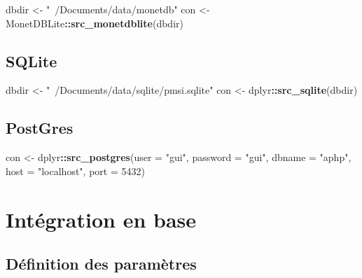 \documentclass[]{book}
\newenvironment{Shaded}{\begin{snugshade}}{\end{snugshade}}
\newcommand{\KeywordTok}[1]{\textcolor[rgb]{0.13,0.29,0.53}{\textbf{#1}}}
\newcommand{\DataTypeTok}[1]{\textcolor[rgb]{0.13,0.29,0.53}{#1}}
\newcommand{\DecValTok}[1]{\textcolor[rgb]{0.00,0.00,0.81}{#1}}
\newcommand{\StringTok}[1]{\textcolor[rgb]{0.31,0.60,0.02}{#1}}
\newcommand{\OperatorTok}[1]{\textcolor[rgb]{0.81,0.36,0.00}{\textbf{#1}}}
\newcommand{\NormalTok}[1]{#1}
\begin{document}
\begin{Shaded}
\begin{Highlighting}[]
\NormalTok{dbdir <-}\StringTok{ "~/Documents/data/monetdb"}
\NormalTok{con <-}\StringTok{ }\NormalTok{MonetDBLite}\OperatorTok{::}\KeywordTok{src_monetdblite}\NormalTok{(dbdir)}
\end{Highlighting}
\end{Shaded}

\subsection{SQLite}\label{sqlite}

\begin{Shaded}
\begin{Highlighting}[]
\NormalTok{dbdir <-}\StringTok{ "~/Documents/data/sqlite/pmsi.sqlite"}
\NormalTok{con <-}\StringTok{ }\NormalTok{dplyr}\OperatorTok{::}\KeywordTok{src_sqlite}\NormalTok{(dbdir)}
\end{Highlighting}
\end{Shaded}

\subsection{PostGres}\label{postgres}

\begin{Shaded}
\begin{Highlighting}[]
\NormalTok{con <-}\StringTok{ }\NormalTok{dplyr}\OperatorTok{::}\KeywordTok{src_postgres}\NormalTok{(}\DataTypeTok{user =} \StringTok{"gui"}\NormalTok{, }\DataTypeTok{password =} \StringTok{"gui"}\NormalTok{, }\DataTypeTok{dbname =} \StringTok{"aphp"}\NormalTok{,}
                    \DataTypeTok{host =} \StringTok{"localhost"}\NormalTok{, }\DataTypeTok{port =} \DecValTok{5432}\NormalTok{)}
\end{Highlighting}
\end{Shaded}

\section{Intégration en base}\label{integration-en-base}

\subsection{Définition des paramètres}\label{definition-des-parametres}
\end{document}
